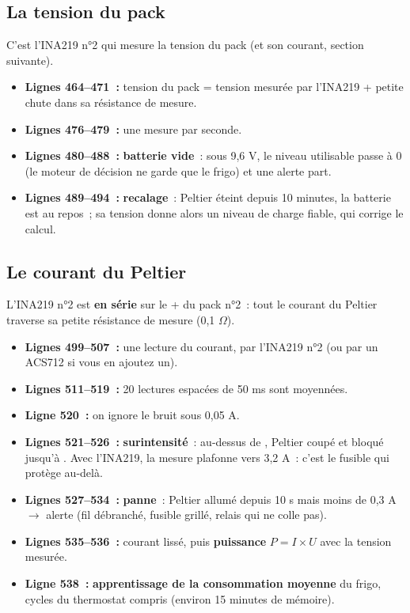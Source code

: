 \subsection{La tension du pack}
C'est l'INA219 n°2 qui mesure la tension du pack (et son courant, section suivante).

\begin{itemize}
  \item \textbf{Lignes 464--471~:} tension du pack = tension mesurée par l'INA219 + petite chute dans sa résistance de mesure.
  \item \textbf{Lignes 476--479~:} une mesure par seconde.
  \item \textbf{Lignes 480--488~:} \textbf{batterie vide}~: sous 9,6 V, le niveau utilisable passe à 0 (le moteur de décision ne garde que le frigo) et une alerte part.
  \item \textbf{Lignes 489--494~:} \textbf{recalage}~: Peltier éteint depuis 10 minutes, la batterie est au repos~; sa tension donne alors un niveau de charge fiable, qui corrige le calcul.
\end{itemize}

\subsection{Le courant du Peltier}
L'INA219 n°2 est \textbf{en série} sur le + du pack n°2~: tout le courant du Peltier traverse sa petite résistance de mesure (0,1 $\Omega$).

\begin{itemize}
  \item \textbf{Lignes 499--507~:} une lecture du courant, par l'INA219 n°2 (ou par un ACS712 si vous en ajoutez un).
  \item \textbf{Lignes 511--519~:} 20 lectures espacées de 50 ms sont moyennées.
  \item \textbf{Ligne 520~:} on ignore le bruit sous 0,05 A.
  \item \textbf{Lignes 521--526~:} \textbf{surintensité}~: au-dessus de , Peltier coupé et bloqué jusqu'à . Avec l'INA219, la mesure plafonne vers 3,2 A~: c'est le fusible qui protège au-delà.
  \item \textbf{Lignes 527--534~:} \textbf{panne}~: Peltier allumé depuis 10 s mais moins de 0,3 A $\rightarrow$ alerte (fil débranché, fusible grillé, relais qui ne colle pas).
  \item \textbf{Lignes 535--536~:} courant lissé, puis \textbf{puissance} $P = I \times U$ avec la tension mesurée.
  \item \textbf{Ligne 538~:} \textbf{apprentissage de la consommation moyenne} du frigo, cycles du thermostat compris (environ 15 minutes de mémoire).
\end{itemize}

